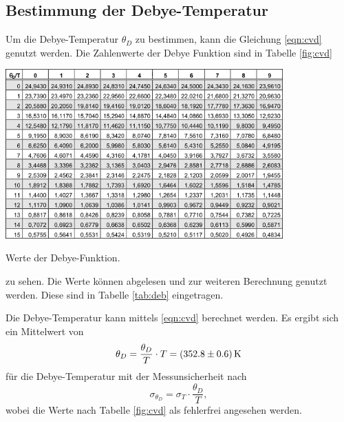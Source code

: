 \subsection{Bestimmung der Debye-Temperatur}
Um die Debye-Temperatur $\theta_D$ zu bestimmen, kann die Gleichung \eqref{eqn:cvd} genutzt werden. Die Zahlenwerte der Debye Funktion sind in Tabelle \ref{fig:cvd}
\begin{table}
	\centering
	\includegraphics[width=0.8\textwidth]{graphics/cvd.png}
	\caption{Werte der Debye-Funktion.}
	\label{fig:cvd}
\end{table}
zu sehen.
Die Werte können abgelesen und zur weiteren Berechnung genutzt werden.
Diese sind in Tabelle \ref{tab:deb} eingetragen.

Die Debye-Temperatur kann mittels \eqref{eqn:cvd} berechnet werden.
Es ergibt sich ein Mittelwert von
\begin{equation*}
	\theta_D = \frac{\theta_D}{T}\cdot T = \SI{352.8\pm0.6}{\kelvin}
\end{equation*}
für die Debye-Temperatur mit der Messunsicherheit nach
\begin{equation*}
	\sigma_{\theta_D} = \sigma_T\cdot \frac{\theta_D}{T},%
\end{equation*}
wobei die Werte nach Tabelle \ref{fig:cvd} als fehlerfrei angesehen werden.

